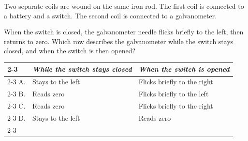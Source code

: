 \begin{quizq}{}
Two separate coils are wound on the same iron rod. The first coil is connected to a battery and a
switch. The second coil is connected to a galvanometer.
\begin{center}
\end{center}
When the switch is closed, the galvanometer needle flicks briefly to the left, then returns to zero.
Which row describes the galvanometer while the switch stays closed, and when the switch is then
opened?
\begin{center}
  \renewcommand\arraystretch{1.7}
  \begin{tabular}{@{}p{10mm}|>{\centering\arraybackslash}p{50mm}|>{\centering\arraybackslash}p{50mm}|}
    \cline{2-3}
    & \textit{While the switch stays closed} & \textit{When the switch is opened}\\ \cline{2-3}
    A. & Stays to the left & Flicks briefly to the right\\ \cline{2-3}
    B. & Reads zero & Flicks briefly to the left\\ \cline{2-3}
    C. & Reads zero & Flicks briefly to the right\\ \cline{2-3}
    D. & Stays to the left & Reads zero\\ \cline{2-3}
  \end{tabular}
\end{center}
\end{quizq}

